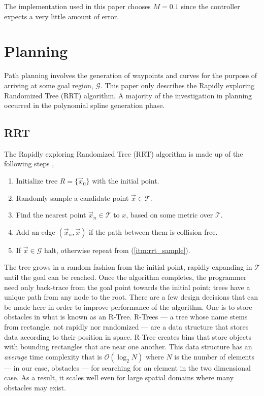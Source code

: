 \documentclass[oneside, 11pt]{book}
\begin{document}
The implementation used in this paper chooses $M=0.1$ since the controller expects a very little amount of error.

\chapter{Planning}\label{sec:planning}
Path planning involves the generation of waypoints and curves for the purpose of arriving at some goal region, $\mathcal{G}$. This paper only describes the Rapidly exploring Randomized Tree (RRT) algorithm. A majority of the investigation in planning occurred in the polynomial spline generation phase.

\section{RRT}
The Rapidly exploring Randomized Tree (RRT) algorithm is made up of the following steps \cite{Karaman11},
\begin{enumerate}
    \item Initialize tree $R=\{ \vec{x}_0 \}$ with the initial point.
    \item Randomly sample a candidate point $\vec{x} \in \mathcal{T}$.\label{itm:rrt_sample}
    \item Find the nearest point $\vec{x}_n\in \mathcal{T}$ to $x$, based on some metric over $\mathcal{T}$.
    \item Add an edge $(\vec{x}_n, \vec{x})$ if the path between them is collision free.
    \item If $\vec{x}\in\mathcal{G}$ halt, otherwise repeat from (\ref{itm:rrt_sample}).
\end{enumerate}
The tree grows in a random fashion from the initial point, rapidly expanding in $\mathcal{T}$ until the goal can be reached. Once the algorithm completes, the programmer need only back-trace from the goal point towards the initial point; trees have a unique path from any node to the root. There are a few design decisions that can be made here in order to improve performance of the algorithm. One is to store obstacles in what is known as an R-Tree. R-Trees --- a tree whose name stems from rectangle, not rapidly nor randomized --- are a data structure that stores data according to their position in space. R-Tree creates bins that store objects with  bounding rectangles that are near one another. This data structure has an \emph{average} time complexity that is $\mathcal{O}(\log_2 N)$ where $N$ is the number of elements --- in our case, obstacles --- for searching for an element in the two dimensional case. As a result, it scales well even for large spatial domains where many obstacles may exist.
\end{document}
